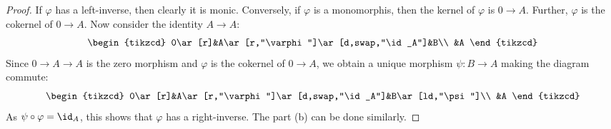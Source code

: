 \begin{proof}
If $\varphi$ has a left-inverse, then clearly it is monic. Conversely, if $\varphi$ is a monomorphis, then the kernel of $\varphi$ is $0\to A$. Further, $\varphi$ is the cokernel of $0\to A$. Now consider the identity $A\to A$:
\[\begin{tikzcd}
0\ar[r]&A\ar[r,"\varphi"]\ar[d,swap,"\id_A"]&B\\
&A
\end{tikzcd}\]
Since $0\to A\to A$ is the zero morphism and $\varphi$ is the cokernel of $0\to A$, we obtain a unique morphism $\psi:B\to A$ making the diagram commute:
\[\begin{tikzcd}
0\ar[r]&A\ar[r,"\varphi"]\ar[d,swap,"\id_A"]&B\ar[ld,"\psi"]\\
&A
\end{tikzcd}\]
As $\psi\circ\varphi=\id_A$, this shows that $\varphi$ has a right-inverse. The part (b) can be done similarly.
\end{proof}
